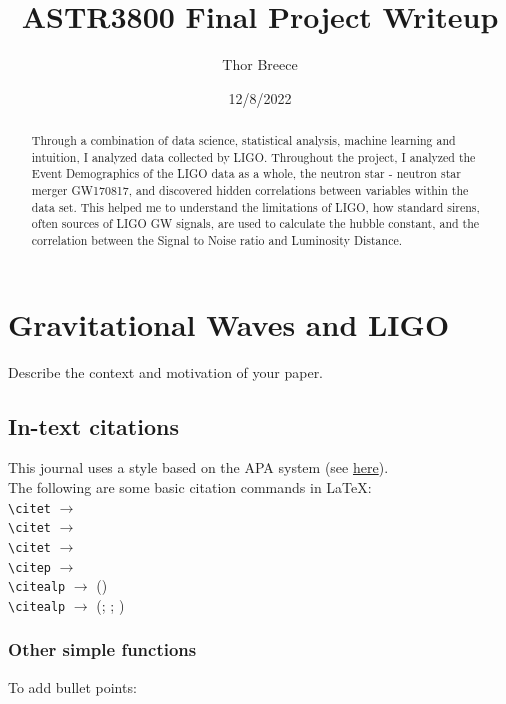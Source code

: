 \documentclass{article}
\title{ASTR3800 Final Project Writeup}
\author{Thor Breece}
\date{12/8/2022} %
\begin{document}
\maketitle

\begin{abstract} 
\noindent  
Through a combination of data science, statistical analysis, machine learning and intuition, I analyzed data collected
by LIGO. Throughout the project, I analyzed the Event Demographics of the LIGO data as a whole, the neutron star - neutron star merger GW170817, and discovered 
hidden correlations between variables within the data set. This helped me to understand the limitations of LIGO, how standard sirens, often sources of LIGO GW signals, 
are used to calculate the hubble constant, and the correlation between the Signal to Noise ratio and Luminosity Distance.
\end{abstract}



\section{Gravitational Waves and LIGO}


Describe the context and motivation of your paper.

\subsection{In-text citations}
This journal uses a style based on the APA system (see \href{https://openhumanitiesdata.metajnl.com/about/submissions/#References}{here}). \\
The following are some basic citation commands in \LaTeX: \\

\noindent
\verb|\citet| $\rightarrow$ \citet{jenset&mcgil}\\
\verb|\citet| $\rightarrow$ \citet{australiashealth}\\
\verb|\citet| $\rightarrow$ \citet{shree-a}\\
\verb|\citep| $\rightarrow$ \citep{fabricius-hansen2012b}\\
\verb|\citealp| $\rightarrow$ (\citealp{eckhoff2018a})\\
\verb|\citealp| $\rightarrow$ (\citealp{eckhoff2018a}; \citealp{fabricius-hansen2012b}; \citealp{shree-a})\\

\subsubsection{Other simple functions}
To add bullet points:
\end{document}
